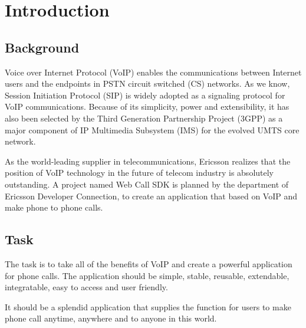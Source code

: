 \chapter{Introduction}
\label{sec:Introduction}


\section{Background}
\label{sec:Introduction:Background}

Voice over Internet Protocol (VoIP)\label{sym:VoIP} enables the communications between Internet users and the endpoints in PSTN circuit switched (CS)\label{sym:CS} networks. As we know, Session Initiation Protocol (SIP)\label{sym:SIP} is widely adopted as a signaling protocol for VoIP communications. Because of its simplicity, power and extensibility, it has also been selected by the Third Generation Partnership Project (3GPP)\label{sym:3GPP} as a major component of IP Multimedia Subsystem (IMS)\label{sym:IMS} for the evolved UMTS core network. 

As the world-leading supplier in telecommunications, Ericsson realizes that the position of VoIP technology in the future of telecom industry is absolutely outstanding. A project named Web Call SDK is planned by the department of Ericsson Developer Connection, to create an application that based on VoIP and make phone to phone calls. 

\section{Task}
\label{sec:Introduction:Task}

The task is to take all of the benefits of VoIP and create a powerful application for phone calls. The application should be simple, stable, reusable, extendable, integratable, easy to access and user friendly. 

It should be a splendid application that supplies the function for users to make phone call anytime, anywhere and to anyone in this world.

